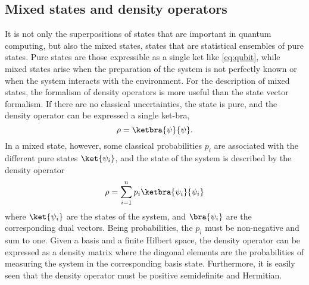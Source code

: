 \subsection{Mixed states and density operators}
It is not only the superpositions of states that are important in quantum computing, but also the mixed states, states that are statistical ensembles of pure states.
Pure states are those expressible as a single ket like \cref{eq:qubit}, while mixed states arise when the preparation of the system is not perfectly known or when the system interacts with the environment.
For the description of mixed states, the formalism of density operators is more useful than the state vector formalism.
If there are no classical uncertainties, the state is pure, and the density operator can be expressed a single ket-bra,
\begin{equation}
  \rho = \ketbra{\psi}{\psi}.
  \label{eq:pure_density}
\end{equation}
In a mixed state, however, some classical probabilities $p_i$ are associated with the different pure states $\ket{\psi_i}$, and the state of the system is described by the density operator
\begin{equation}
  \rho = \sum_{i=1}^n p_i \ketbra{\psi_i}{\psi_i}
  \label{eq:density}
\end{equation}
where $\ket{\psi_i}$ are the states of the system, and $\bra{\psi_i}$ are the corresponding dual vectors.
Being probabilities, the $p_i$ must be non-negative and sum to one.
Given a basis and a finite Hilbert space, the density operator can be expressed as a density matrix\footnotemark{} where the diagonal elements are the probabilities of measuring the system in the corresponding basis state.
Furthermore, it is easily seen that the density operator must be positive semidefinite and Hermitian.



